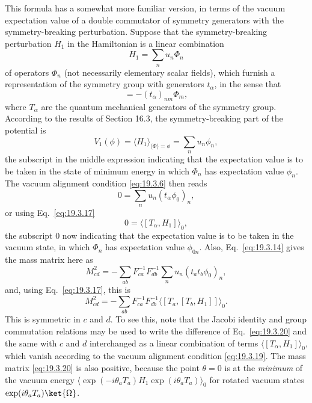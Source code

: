 This formula has a somewhat more familiar version, in terms of the vacuum expectation value of a double commutator of symmetry generators with the symmetry-breaking perturbation. Suppose that the symmetry-breaking perturbation $H_1$ in the Hamiltonian is a linear combination
\begin{equation}
H_1=\sum_n u_n\Phi_n
\tag{19.3.16}\label{eq:19.3.16}
\end{equation}
of operators $\Phi_n$ (not necessarily elementary scalar fields), which furnish a representation of the symmetry group with generators $t_\alpha$, in the sense that
\begin{equation}
[T_\alpha,\Phi_n]=-(t_\alpha)_{nm}\Phi_m,
\tag{19.3.17}\label{eq:19.3.17}
\end{equation}
where $T_\alpha$ are the quantum mechanical generators of the symmetry group. According to the results of Section 16.3, the symmetry-breaking part of the potential is
\begin{equation}
V_1(\phi)=\langle H_1\rangle_{\langle\Phi\rangle=\phi}
=\sum_n u_n\phi_n,
\tag{19.3.18}\label{eq:19.3.18}
\end{equation}
the subscript in the middle expression indicating that the expectation value is to be taken in the state of minimum energy in which $\Phi_n$ has expectation value $\phi_n$. The vacuum alignment condition \eqref{eq:19.3.6} then reads
\[
0=\sum_n u_n(t_\alpha\phi_0)_n,
\]
or using Eq.~\eqref{eq:19.3.17}
\begin{equation}
0=\langle[T_\alpha,H_1]\rangle_0,
\tag{19.3.19}\label{eq:19.3.19}
\end{equation}
the subscript $0$ now indicating that the expectation value is to be taken in the vacuum state, in which $\Phi_n$ has expectation value $\phi_{0n}$. Also, Eq.~\eqref{eq:19.3.14} gives the mass matrix here as
\[
M_{cd}^2=-\sum_{ab}F_{ca}^{-1}F_{db}^{-1}
\sum_n u_n(t_at_b\phi_0)_n,
\]
and, using Eq.~\eqref{eq:19.3.17}, this is
\begin{equation}
M_{cd}^2=-\sum_{ab}F_{ca}^{-1}F_{db}^{-1}
\langle[T_a,[T_b,H_1]]\rangle_0.
\tag{19.3.20}\label{eq:19.3.20}
\end{equation}
This is symmetric in $c$ and $d$. To see this, note that the Jacobi identity and group commutation relations may be used to write the difference of Eq.~\eqref{eq:19.3.20} and the same with $c$ and $d$ interchanged as a linear combination of terms $\langle[T_\alpha,H_1]\rangle_0$, which vanish according to the vacuum alignment condition \eqref{eq:19.3.19}. The mass matrix \eqref{eq:19.3.20} is also positive, because the point $\theta=0$ is at the \emph{minimum} of the vacuum energy $\langle\exp(-i\theta_aT_a)H_1\exp(i\theta_aT_a)\rangle_0$ for rotated vacuum states $\exp(i\theta_aT_a)\ket{\Omega}$.
